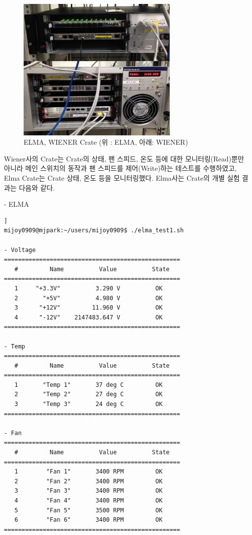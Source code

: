 \documentclass[11pt
  , a4paper
  , article
  , oneside
]{memoir}
\begin{document}
\begin{figure}[h]
  \centering
  \includegraphics[width=0.7\textwidth]{./images/elmawiener.eps}
  \caption{ELMA, WIENER Crate (위 : ELMA, 아래: WIENER)}
  \label{fig:elmawiener}   
\end{figure}

\vspace{2mm}

Wiener사의 Crate는 Crate의 상태, 팬 스피드, 온도 등에 대한 모니터링(Read)뿐만 아니라 메인 스위치의 동작과 팬 스피드를 제어(Write)하는 테스트를 수행하였고, Elma Crate는 Crate 상태, 온도 등을 모니터링했다. Elma사는 Crate의 개별 실험 결과는 다음와 같다.

\vspace{5cm}
- ELMA
\begin{lstlisting}[style=termstyle, caption=ELMA Crate 모니터링 및 제어결과]]
mijoy0909@mjpark:~/users/mijoy0909$ ./elma_test1.sh

- Voltage
==================================================
   #         Name          Value          State
==================================================
   1     "+3.3V"          3.290 V          OK
   2       "+5V"          4.980 V          OK
   3      "+12V"         11.960 V          OK
   4      "-12V"    2147483.647 V          OK
==================================================

- Temp
==================================================
   #         Name          Value          State
==================================================
   1       "Temp 1"       37 deg C         OK
   2       "Temp 2"       27 deg C         OK
   3       "Temp 3"       24 deg C         OK
==================================================

- Fan
==================================================
   #         Name          Value          State
==================================================
   1        "Fan 1"       3400 RPM         OK
   2        "Fan 2"       3400 RPM         OK
   3        "Fan 3"       3400 RPM         OK
   4        "Fan 4"       3400 RPM         OK
   5        "Fan 5"       3500 RPM         OK
   6        "Fan 6"       3400 RPM         OK
==================================================
\end{lstlisting}
\end{document}
